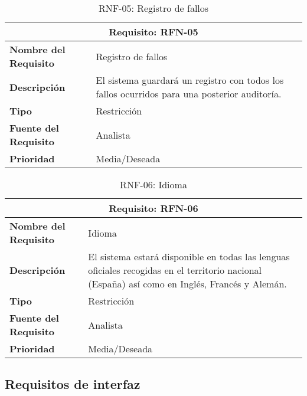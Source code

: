 \begin{table}[H]
\begin{center}
\begin{tabular}{p{} p{7cm}}
\multicolumn{2}{c}{\textbf{Requisito: RFN-05} } \\
\hline \hline
\textbf{Nombre del Requisito} &  Registro de fallos \\
\hline
\textbf{Descripción} & El sistema guardará un registro con todos los fallos ocurridos para una posterior auditoría.\\
\hline
\textbf{Tipo} & Restricción \\
\hline
\textbf{Fuente del Requisito} &  Analista \\
\hline
\textbf{Prioridad} &  Media/Deseada \\ \hline
\end{tabular}
\caption{RNF-05: Registro de fallos}
\label{tab:RFN-05}
\end{center}
\end{table}

\begin{table}[H]
\begin{center}
\begin{tabular}{p{} p{7cm}}
\multicolumn{2}{c}{\textbf{Requisito: RFN-06} } \\
\hline \hline
\textbf{Nombre del Requisito} &  Idioma \\
\hline
\textbf{Descripción} & El sistema estará disponible en todas las lenguas oficiales recogidas en el territorio nacional (España) así como en Inglés, Francés y Alemán. \\
\hline
\textbf{Tipo} & Restricción \\
\hline
\textbf{Fuente del Requisito} &  Analista \\
\hline
\textbf{Prioridad} &  Media/Deseada \\ \hline
\end{tabular}
\caption{RNF-06: Idioma}
\label{tab:RFN-06}
\end{center}
\end{table}


\subsection{Requisitos de interfaz}

